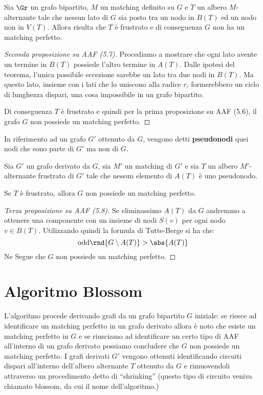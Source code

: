 \documentclass[\main/main.tex]{subfiles}
\begin{document}
\begin{proposition}
	Sia \(\Gr \) un grafo bipartito, \(M\) un matching definito su \(G\) e \(T\) un albero \(M\)-alternante tale che nessun lato di \(G\) sia posto tra un nodo in \(B(T)\) ed un nodo non in \(V(T)\). Allora risulta che \(T\) è frustrato e di conseguenza \(G\) non ha un matching perfetto.
\end{proposition}
\begin{proof}[Seconda proposizione su AAF (5.7)]
	Procediamo a mostrare che ogni lato avente un termine in \(B(T)\) possiede l'altro termine in \(A(T)\). Dalle ipotesi del teorema, l'unica possibile eccezione sarebbe un lato tra due nodi in \(B(T)\). Ma questo lato, insieme con i lati che lo uniscono alla radice \(r\), formerebbero un ciclo di lunghezza dispari, una cosa impossibile in un grafo bipartito.

	Di conseguenza \(T\) è frustrato e quindi per la prima proposizione su AAF (5.6), il grafo \(G\) non possiede un matching perfetto.
\end{proof}
\begin{definition}[Pseudonodo]
	In riferimento ad un grafo \(G'\) ottenuto da \(G\), vengono detti \textbf{pseudonodi} quei nodi che sono parte di \(G'\) ma non di \(G\).
\end{definition}
\begin{proposition}
	Sia \(G'\) un grafo derivato da \(G\), sia \(M'\) un matching di \(G'\) e sia \(T\) un albero \(M'\)-alternante frustrato di \(G'\) tale che nessun elemento di \(A(T)\) è uno pseudonodo.

	Se \(T\) è frustrato, allora \(G\) non possiede un matching perfetto.
\end{proposition}
\begin{proof}[Terza proposizione su AAF (5.8)]
	Se eliminassimo \(A(T)\) da \(G\) andremmo a ottenere una componente con un insieme di nodi \(S(v)\) per ogni nodo \(v \in B(T)\). Utilizzando quindi la formula di Tutte-Berge si ha che:
	\[
		\text{odd}\rnd{G \setminus A(T)} > \abs{A(T)}
	\]
	Ne Segue che \(G\) non possiede un matching perfetto.
\end{proof}
\clearpage
\section{Algoritmo Blossom}
L'algoritmo procede derivando grafi da un grafo bipartito \(G\) iniziale: se riesce ad identificare un matching perfetto in un grafo derivato allora è noto che esiste un matching perfetto in \(G\) e se riusciamo ad identificare un certo tipo di AAF all'interno di un grafo derivato possiamo concludere che \(G\) non possiede un matching perfetto. I grafi derivati \(G'\) vengono ottenuti identificando circuiti dispari all'interno dell'albero alternante \(T\) ottenuto da \(G\) e rimuovendoli attraverso un procedimento detto di ``shrinking'' (questo tipo di circuito veniva chiamato blossom, da cui il nome dell'algoritmo.)
\end{document}

